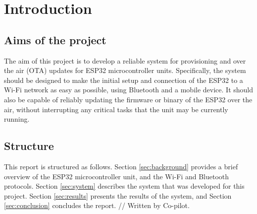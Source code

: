 \section{Introduction}
\label{sec:introduction}

\subsection{Aims of the project}
\label{sec:aims}
The aim of this project is to develop a reliable system for provisioning and over the air (OTA) updates for ESP32 microcontroller units. Specifically, the system should be designed to make the initial setup and connection of the ESP32 to a Wi-Fi network as easy as possible, using Bluetooth and a mobile device. It should also be capable of reliably updating the firmware or binary of the ESP32 over the air, without interrupting any critical tasks that the unit may be currently running.

\subsection{Structure}
\label{sec:structure}
This report is structured as follows. Section \ref{sec:background} provides a brief overview of the ESP32 microcontroller unit, and the Wi-Fi and Bluetooth protocols. Section \ref{sec:system} describes the system that was developed for this project. Section \ref{sec:results} presents the results of the system, and Section \ref{sec:conclusion} concludes the report. // Written by Co-pilot.